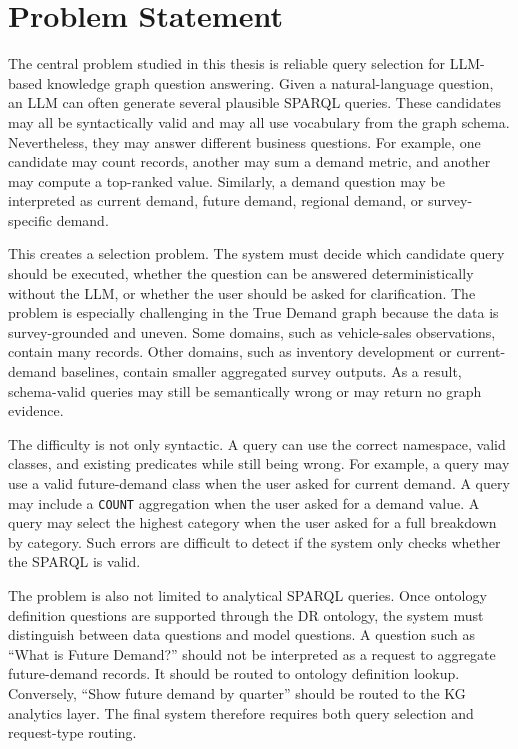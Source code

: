 \documentclass[
  12pt,
  english,
  oneside]{report}
\begin{document}
\section{Problem Statement}

The central problem studied in this thesis is reliable query selection for LLM-based knowledge graph question answering. Given a natural-language question, an LLM can often generate several plausible SPARQL queries. These candidates may all be syntactically valid and may all use vocabulary from the graph schema. Nevertheless, they may answer different business questions. For example, one candidate may count records, another may sum a demand metric, and another may compute a top-ranked value. Similarly, a demand question may be interpreted as current demand, future demand, regional demand, or survey-specific demand.

This creates a selection problem. The system must decide which candidate query should be executed, whether the question can be answered deterministically without the LLM, or whether the user should be asked for clarification. The problem is especially challenging in the True Demand graph because the data is survey-grounded and uneven. Some domains, such as vehicle-sales observations, contain many records. Other domains, such as inventory development or current-demand baselines, contain smaller aggregated survey outputs. As a result, schema-valid queries may still be semantically wrong or may return no graph evidence.

The difficulty is not only syntactic. A query can use the correct namespace, valid classes, and existing predicates while still being wrong. For example, a query may use a valid future-demand class when the user asked for current demand. A query may include a \texttt{COUNT} aggregation when the user asked for a demand value. A query may select the highest category when the user asked for a full breakdown by category. Such errors are difficult to detect if the system only checks whether the SPARQL is valid.

The problem is also not limited to analytical SPARQL queries. Once ontology definition questions are supported through the DR ontology, the system must distinguish between data questions and model questions. A question such as ``What is Future Demand?'' should not be interpreted as a request to aggregate future-demand records. It should be routed to ontology definition lookup. Conversely, ``Show future demand by quarter'' should be routed to the KG analytics layer. The final system therefore requires both query selection and request-type routing.
\end{document}

